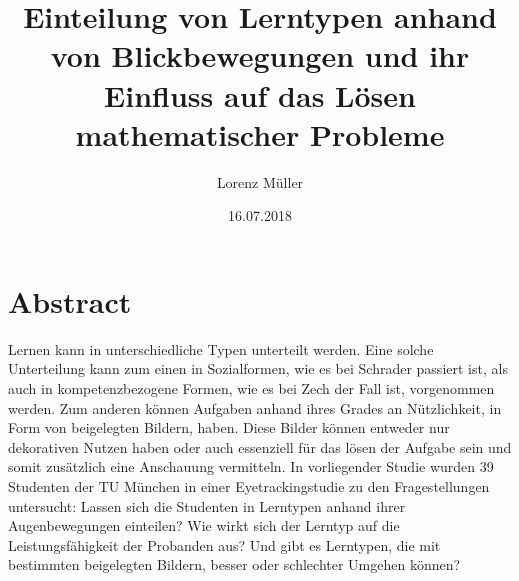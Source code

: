 %
% 
% 
%



\renewcommand{\Thema}{%
    Einteilung von Lerntypen anhand von Blickbewegungen und ihr Einfluss auf das Lösen 
    mathematischer Probleme}






\title{Einteilung von Lerntypen anhand von Blickbewegungen und ihr Einfluss auf das Lösen 
        mathematischer Probleme}
\author{Lorenz Müller}
\date{16.07.2018}


\section*{Abstract}

Lernen kann in unterschiedliche Typen unterteilt werden. Eine solche Unterteilung kann zum einen in Sozialformen, wie es bei Schrader passiert ist, als auch in kompetenzbezogene Formen, wie es bei Zech der Fall ist, vorgenommen werden. Zum anderen können Aufgaben anhand ihres Grades an Nützlichkeit, in Form von beigelegten Bildern, haben. Diese Bilder können entweder nur dekorativen Nutzen haben oder auch essenziell für das lösen der Aufgabe sein und somit zusätzlich eine Anschauung vermitteln. In vorliegender Studie wurden 39 Studenten der TU München in einer Eyetrackingstudie zu den Fragestellungen untersucht: Lassen sich die Studenten in Lerntypen anhand ihrer Augenbewegungen einteilen? Wie wirkt sich der Lerntyp auf die Leistungsfähigkeit der Probanden aus? Und gibt es Lerntypen, die mit bestimmten beigelegten Bildern, besser oder schlechter Umgehen können?
  
